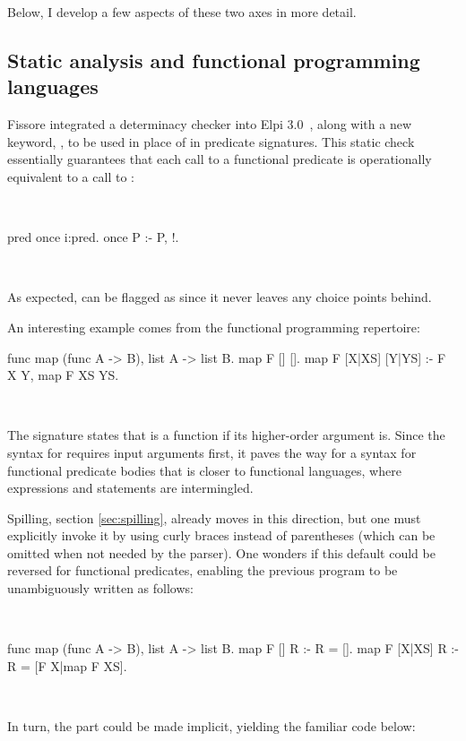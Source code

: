 \documentclass[a4paper, 11pt]{book}
\newenvironment{elpicode}
  {\VerbatimEnvironment~\\\begin{elpibox}\begin{xelpicode}}{\end{xelpicode}
\end{elpibox}\\}
\begin{document}
Below, I develop a few aspects of these two axes in more detail.

\subsection{Static analysis and functional programming languages} 

Fissore
integrated a determinacy checker into Elpi 3.0~\cite{elpidet}, along with a new
keyword, , to be used in place of  in predicate
signatures. This static check essentially guarantees that each call to a
functional predicate  is operationally equivalent to a call to
:

\begin{elpicode}
pred once i:pred.
once P :- P, !.
\end{elpicode}

\noindent As expected,  can be flagged as  since it never
leaves any choice points behind.

An interesting example comes from the functional programming repertoire:
\begin{elpicode}
func map (func A -> B), list A -> list B.
map F [] [].
map F [X|XS] [Y|YS] :- F X Y, map F XS YS.
\end{elpicode}

\noindent The signature states that  is a function if its
higher-order argument  is. Since the syntax for  requires
input arguments first, it paves the way for a syntax for functional predicate
bodies that is closer to functional languages, where expressions and statements
are intermingled.

Spilling, section \ref{sec:spilling}, already moves in this direction, but one must
explicitly invoke it by using curly braces instead of parentheses (which can be
omitted when not needed by the parser). One wonders if this default could be
reversed for functional predicates, enabling the previous program to be
unambiguously written as follows:

\begin{elpicode}
func map (func A -> B), list A -> list B.
map F [] R :- R = [].
map F [X|XS] R :- R = [F X|map F XS].
\end{elpicode}

\noindent
In turn, the  part could be made implicit, yielding the familiar
code below:
\end{document}
